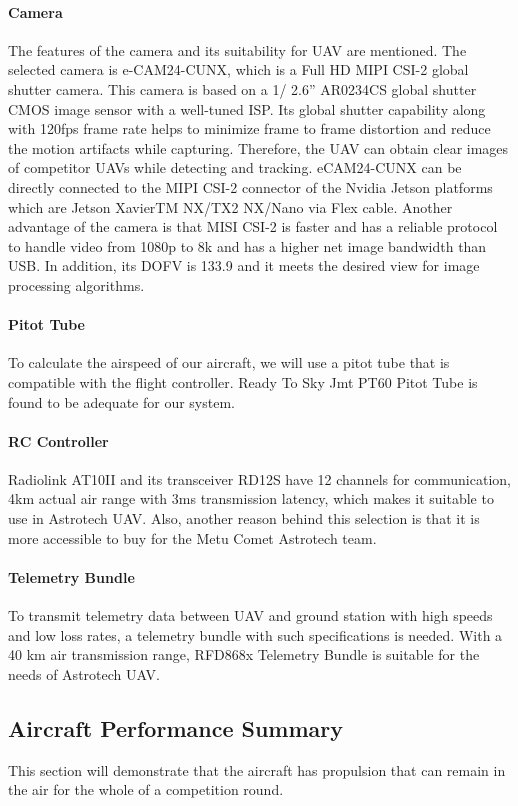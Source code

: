 \documentclass[12pt]{article}
\begin{document}
\paragraph*{Camera} The features of the camera and its suitability for UAV  are mentioned. The selected camera is e-CAM24-CUNX, which is a Full HD MIPI CSI-2 global shutter camera. This camera is based on a 1/ 2.6” AR0234CS global shutter CMOS image sensor with a well-tuned ISP. Its global shutter capability along with 120fps frame rate helps to minimize frame to frame distortion and reduce the motion artifacts while capturing. Therefore, the UAV can obtain clear images of competitor UAVs while detecting and tracking. eCAM24-CUNX can be directly connected to the MIPI CSI-2 connector of the Nvidia Jetson platforms which are Jetson XavierTM NX/TX2 NX/Nano via Flex cable. Another advantage of the camera is that MISI CSI-2 is faster and has a reliable protocol to handle video from 1080p to 8k and has a higher net image bandwidth than USB. In addition, its DOFV is 133.9 and it meets the desired view for image processing algorithms.

\paragraph*{Pitot Tube} To calculate the airspeed of our aircraft, we will use a pitot tube that is compatible with the flight controller. Ready To Sky Jmt PT60 Pitot Tube is found to be adequate for our system.

\paragraph*{RC Controller} Radiolink AT10II and its transceiver RD12S have 12 channels for communication, 4km actual air range with 3ms transmission latency, which makes it suitable to use in Astrotech UAV. Also, another reason behind this selection is that it is more accessible to buy for the Metu Comet Astrotech team. 

\paragraph*{Telemetry Bundle} To transmit telemetry data between UAV and ground station with high speeds and low loss rates, a telemetry bundle with such specifications is needed. With a 40 km air transmission range, RFD868x Telemetry Bundle is suitable for the needs of Astrotech UAV. 

\subsection{Aircraft Performance Summary}
This section will demonstrate that the aircraft has propulsion that can remain in the air for the whole of a competition round.
\end{document}
